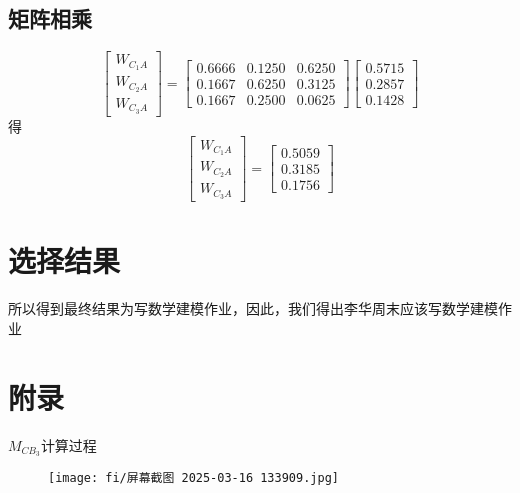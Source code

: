 \documentclass{article}
\begin{document}
\subsection{矩阵相乘} 
\begin{equation}
    \left[
    \begin{array}{c}
    W_{C_1A} \\
    W_{C_2A} \\
    W_{C_3A}
    \end{array}
    \right]
    =
    \left[
    \begin{array}{ccc}
        0.6666 & 0.1250 & 0.6250\\ 
        0.1667 & 0.6250 & 0.3125 \\
        0.1667 & 0.2500 & 0.0625
    \end{array}
    \right]
    \left[
    \begin{array}{c}
        0.5715\\ 
        0.2857 \\
        0.1428
    \end{array}
    \right]
    \end{equation}
得
    \begin{equation}
        \left[
        \begin{array}{c}
        W_{C_1A} \\
        W_{C_2A} \\
        W_{C_3A}
        \end{array}
        \right]
        =
        \left[
        \begin{array}{c}
            0.5059\\ 
            0.3185 \\
            0.1756
        \end{array}
        \right]
        \end{equation}
\section{选择结果}
所以得到最终结果为写数学建模作业，因此，我们得出李华周末应该写数学建模作业
\section{附录}
$M_{CB_3}$计算过程
     \begin{figure}[hb]
        \centering
        \texttt{[image: fi/屏幕截图 2025-03-16 133909.jpg]}
     \end{figure}
\end{document}
